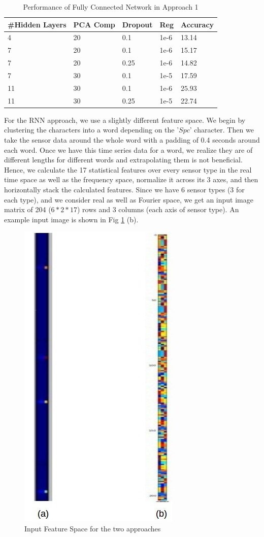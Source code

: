 \documentclass[10pt,twocolumn,letterpaper]{article}
\begin{document}
\begin{table}[t]
  \small
  \caption{Performance of Fully Connected Network in Approach 1}
  \label{initial_accuracies}
  \centering
  \begin{tabular}{l|l|l|l|l}
    \hline
    \#Hidden Layers & PCA Comp & Dropout & Reg & Accuracy \\
    \hline
    4 & 20 & 0.1 & 1e-6 & 13.14\\
    7 & 20 & 0.1 & 1e-6 & 15.17\\
    7 & 20 & 0.25 & 1e-6 & 14.82\\
    7 & 30 & 0.1 & 1e-5 & 17.59\\
    11 & 30 & 0.1 & 1e-6 & $\mathbf{25.93}$\\
    11 & 30 & 0.25 & 1e-5 & 22.74\\
    \hline
  \end{tabular}
\end{table}

For the RNN approach, we use a slightly different feature space. We begin by clustering the characters into a word depending on the '$Spc$' character. Then we take the sensor data around the whole word with a padding of 0.4 seconds around each word. Once we have this time series data for a word, we realize they are of different lengths for different words and extrapolating them is not beneficial. Hence, we calculate the 17 statistical features over every sensor type in the real time space as well as the frequency space, normalize it across its 3 axes, and then horizontally stack the calculated features. Since we have 6 sensor types (3 for each type), and we consider real as well as Fourier space, we get an input image matrix of 204 ($6*2*17$) rows and 3 columns (each axis of sensor type). An example input image is shown in Fig \ref{fig:feature_space} (b).

\begin{figure}[t]
\begin{center}
   \includegraphics[width=0.4\linewidth]{./feature.jpg}
\end{center}
   \caption{Input Feature Space for the two approaches}
\label{fig:feature_space}
\end{figure}
\end{document}
